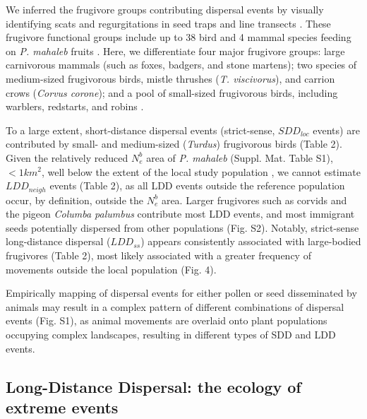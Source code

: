 \documentclass[a4paper, 12pt]{article}
\begin{document}
\begin{linenumbers}
We inferred the frugivore groups contributing dispersal events by visually identifying scats and regurgitations in seed traps and line transects \citep[see ][ and Suppl. Mat. for additional details of methods]{Jordano:2007}. These frugivore functional groups include up to 38 bird and 4 mammal species feeding on \textit{P. mahaleb} fruits \citep{Jordano:2000ft}. Here, we differentiate four major frugivore groups: large carnivorous mammals (such as foxes, badgers, and stone martens); two species of medium-sized frugivorous birds, mistle thrushes (\textit{T. viscivorus}), and carrion crows (\textit{Corvus corone}); and a pool of small-sized frugivorous birds, including warblers, redstarts, and robins \citep{Jordano:2007}.  

To a large extent, short-distance dispersal events (strict-sense, $SDD_{loc}$ events) are contributed by small- and medium-sized (\textit{Turdus}) frugivorous birds (Table 2). Given the relatively reduced $N^b_e$ area of \textit{P. mahaleb} (Suppl. Mat. Table S1), $< 1km^2$, well below the extent of the local study population \citep{Garcia:2007he,Garcia:2005fu},  we cannot estimate $LDD_{neigh}$ events (Table 2), as all LDD events outside the reference population occur, by definition, outside the $N^b_e$ area. Larger frugivores such as corvids and the pigeon \textit{Columba palumbus} contribute most LDD events, and most immigrant seeds potentially dispersed from other populations (Fig. S2). Notably, strict-sense long-distance dispersal ($LDD_{ss}$) appears consistently associated with large-bodied frugivores (Table 2), most likely associated with a greater frequency of movements outside the local population (Fig. 4).

Empirically mapping of dispersal events for either pollen or seed disseminated by animals may result in a complex pattern of different combinations of dispersal events (Fig. S1), as animal movements are overlaid onto plant populations occupying complex landscapes, resulting in different types of SDD and LDD events. 



\subsection*{Long-Distance Dispersal: the ecology of extreme events}


\end{linenumbers}
\end{document}
